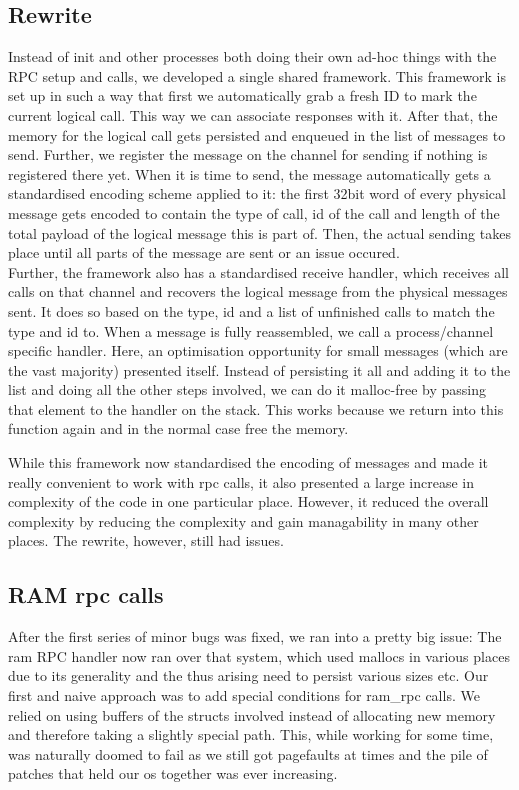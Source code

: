 \subsection{Rewrite}
Instead of init and other processes both doing their own ad-hoc things with 
the RPC setup and calls, we developed a single shared framework.
This framework is set up in such a way that first we automatically grab a fresh ID to 
mark the current logical call. This way we can associate responses with it. After that, the memory for the logical call gets persisted and enqueued in the list of 
messages to send. Further, we register the message on the channel for sending if 
nothing is registered there yet.  
When it is time to send, the message automatically gets a standardised encoding 
scheme applied to it: the first 32bit word of every physical message gets 
encoded to contain the type of call, id of the call and length of the total 
payload of the logical message this is part of. Then, the actual sending takes 
place until all parts of the message are sent or an issue occured.\\

\medskip
Further, the framework also has a standardised receive handler, which receives 
all calls on that channel and recovers the logical message from the physical 
messages sent. It does so based on the type, id and a list of  
unfinished calls to match the type and id to. 
When a message is fully reassembled, we call a process/channel specific handler. Here, an optimisation opportunity for small 
messages (which are the vast majority) presented itself. Instead of 
persisting it all and adding it to the list and doing all the other steps involved, we can do it malloc-free by passing that element to the handler on the stack. This works because we return into this function again and in the normal case free the memory.

\medskip
While this framework now standardised the encoding of messages and made it 
really convenient to work with rpc calls, it also presented a large increase in complexity of the code in one 
particular place. However, it reduced the overall complexity by reducing the complexity and gain managability in many other places.
The rewrite, however, still had issues. 

\subsection{RAM rpc calls\label{ss:rpc_ram}}
After the first series of minor bugs 
was fixed, we ran into a pretty big issue: The ram RPC handler now ran over 
that system, which used mallocs in various places due to its generality and 
the thus arising need to persist various sizes etc.
Our first and naive approach was to add special 
conditions for ram\_rpc calls. We relied on using buffers of the 
structs involved instead of allocating new memory and therefore taking a slightly special path. 
This, while working for some time, was naturally doomed to fail as we still got 
pagefaults at times and the pile of patches that held our os together was 
ever increasing.
\medskip

